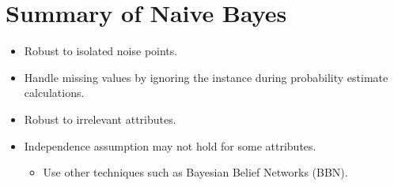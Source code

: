 \section{Summary of Naive Bayes}
\begin{itemize}
    \item Robust to isolated noise points.
    \item Handle missing values by ignoring the instance during probability estimate calculations.
    \item Robust to irrelevant attributes.
    \item Independence assumption may not hold for some attributes.
    \begin{itemize}
        \item Use other techniques such as Bayesian Belief Networks (BBN).
    \end{itemize}
\end{itemize}
